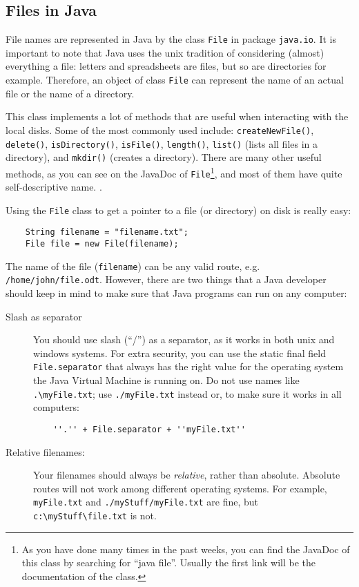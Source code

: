 \subsection{Files in Java}
\label{sec:files-java}

File names are represented in Java by the class \verb+File+ in package
\verb+java.io+. It is important to note that Java uses the unix
tradition of considering (almost) everything a file: letters and
spreadsheets are files, but so are directories for example. Therefore,
an object of class \verb+File+ can represent the name of an actual
file or the name of a directory.

This class implements a lot of methods that are useful when
interacting with the local disks. Some of the most commonly used
include: 
\verb+createNewFile()+, 
\verb+delete()+, 
\verb+isDirectory()+, 
\verb+isFile()+, 
\verb+length()+, 
\verb+list()+ (lists all files in a directory), 
and
\verb+mkdir()+ (creates a directory). There are many other useful
methods, as you can see on the JavaDoc of \verb+File+\footnote{As you
  have done many times in the past weeks, you can find the JavaDoc of
  this class by searching for ``java file''. Usually the first link
  will be the documentation of the class. }, and most of them have
quite self-descriptive name. . 

Using the \verb+File+ class to get a pointer to a file (or directory)
on disk is really easy: 

\begin{verbatim}
    String filename = "filename.txt"; 
    File file = new File(filename);
\end{verbatim}

The name of the file (\verb+filename+) can be any valid route,
e.g. \verb+/home/john/file.odt+. However, there are two things that a
Java developer should keep in mind to make sure that Java programs can
run on any computer: 

\begin{description}
\item[Slash as separator] You should use slash (``/'') as a separator,
  as it works in both unix and windows systems. For extra security,
  you can use the static final field \verb+File.separator+ that always
  has the right value for the operating system the Java Virtual
  Machine is running on. Do not use names like \verb+.\myFile.txt+;
  use \verb+./myFile.txt+ instead or, to make sure it works in all
  computers:

\begin{verbatim}
    ''.'' + File.separator + ''myFile.txt''
\end{verbatim}

\item[Relative filenames: ] Your filenames should always be
  \emph{relative}, rather than absolute. Absolute routes will not work
  among different operating systems. For example, \verb+myFile.txt+ and
  \verb+./myStuff/myFile.txt+ are fine, but \verb+c:\myStuff\file.txt+
  is not. 
\end{description}

